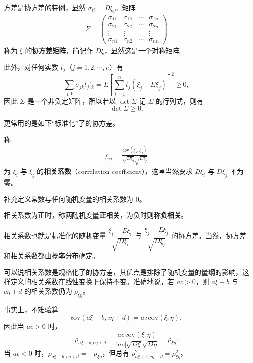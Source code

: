 \documentclass[../../main.tex]{subfiles}
\begin{document}
方差是协方差的特例，显然 $\sigma_{ii}=D\xi_i$。矩阵
\begin{align}
\Sigma=\begin{pmatrix}
\sigma_{11}&\sigma_{12}&\cdots&\sigma_{1n}\\
\sigma_{21}&\sigma_{22}&\cdots&\sigma_{2n}\\
\vdots&\vdots&&\vdots\\
\sigma_{n1}&\sigma_{n2}&\cdots&\sigma_{nn}
\end{pmatrix}\label{align:ch04-协方差矩阵}
\end{align}
称为 $\xi$ 的\textbf{协方差矩阵}，简记作 $D\xi$，显然这是一个对称矩阵。

此外，对任何实数 $t_j$（$j=1,2,\cdots,n$）有
\[
\sum_{j,k}\sigma_{jk}t_j t_k=E\left[\sum_{j=1}^n t_j(\xi_j-E\xi_j)\right]^2\geqslant 0,
\]
因此 $\Sigma$ 是一个非负定矩阵，所以若以 $\det\Sigma$ 记 $\Sigma$ 的行列式，则有
\[
\det\Sigma\geqslant 0.
\]

更常用的是如下``标准化''了的协方差。

\begin{definition}[相关系数]\label{definition:ch04-相关系数}
称
\begin{align}
\rho_{ij}=\frac{\mathrm{cov}(\xi_i,\xi_j)}{\sqrt{D\xi_i}\sqrt{D\xi_j}}\label{align:ch04-相关系数定义}
\end{align}
为 $\xi_i$ 与 $\xi_j$ 的\textbf{相关系数}（correlation coefficient），这里当然要求 $D\xi_i$ 与 $D\xi_j$ 不为零。
\end{definition}

补充定义常数与任何随机变量的相关系数为 $0$。

相关系数为正时，称两随机变量\textbf{正相关}，为负时则称\textbf{负相关}。

相关系数也就是标准化的随机变量 $\dfrac{\xi_i-E\xi_i}{\sqrt{D\xi_i}}$ 与 $\dfrac{\xi_j-E\xi_j}{\sqrt{D\xi_j}}$ 的协方差。当然，协方差和相关系数都由概率分布确定。

可以说相关系数是规格化了的协方差，其优点是排除了随机变量的量纲的影响，这样定义的相关系数在线性变换下保持不变。准确地说，若 $ac>0$，则 $a\xi+b$ 与 $c\eta+d$ 的相关系数仍为 $\rho_{\xi\eta}$。

事实上，不难验算
\[
\mathrm{cov}(a\xi+b,c\eta+d)=ac\,\mathrm{cov}(\xi,\eta),
\]
因此当 $ac>0$ 时，
\[
\rho_{a\xi+b,c\eta+d}=\frac{ac\,\mathrm{cov}(\xi,\eta)}{|ac|\sqrt{D\xi}\sqrt{D\eta}}=\rho_{\xi\eta}.
\]
当 $ac<0$ 时，$\rho_{a\xi+b,c\eta+d}=-\rho_{\xi\eta}$，但总有 $\rho_{a\xi+b,c\eta+d}^2=\rho_{\xi\eta}^2$。
\end{document}
